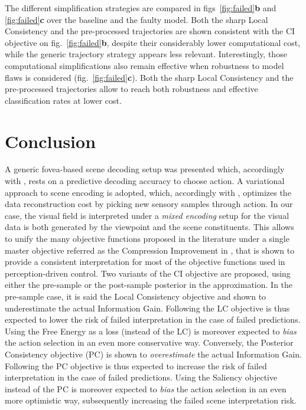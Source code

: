 \documentclass[12pt,twoside,openright]{article}
\begin{document}
The different simplification strategies are compared in figs~\ref{fig:failed}\textbf{b} and \ref{fig:failed}\textbf{c} over the baseline and the faulty model. Both the sharp Local Consistency and the pre-processed trajectories are shown consistent with the CI objective on fig.~\ref{fig:failed}\textbf{b}, despite their considerably lower computational cost, while the generic trajectory strategy appears less relevant. Interestingly, those computational simplifications also remain effective when robustness to model flaws is considered (fig.~\ref{fig:failed}\textbf{c}). 
Both the sharp Local Consistency and the pre-processed trajectories allow to reach both robustness and effective classification rates at lower cost.

\section{Conclusion}
A generic fovea-based scene decoding setup was presented which, accordingly with \citep{najemnik2005optimal}, rests on a predictive decoding accuracy to choose action. A variational approach to scene encoding is adopted, which, accordingly with \citep{friston2012perceptions}, optimizes the data reconstruction cost by picking new sensory samples through action. In our case, the visual field is interpreted under a \emph{mixed encoding} setup for the visual data is both generated by the viewpoint and the scene constituents. 
This allows to unify the many objective functions proposed in the literature under a single master objective referred as the Compression Improvement in \citep{schmidhuber2007simple}, that is shown to provide a consistent interpretation for most of the objective functions used in perception-driven control. Two variants of the CI objective are proposed, using either the pre-sample or the post-sample posterior in the approximation. In the pre-sample case, it is said the Local Consistency objective and shown to underestimate the actual Information Gain. Following the LC objective is thus expected to lower the risk of failed interpretation in the case of failed predictions. Using the Free Energy \citep{friston2015active} as a loss (instead of the LC) is moreover expected to \emph{bias} the action selection in an even more conservative way. 
Conversely, the Posterior Consistency objective (PC) is shown to \emph{overestimate} the actual Information Gain. Following the PC objective is thus expected to increase the risk of failed interpretation in the case of failed predictions. 
Using the Saliency objective \citep{itti2005bayesian} instead of the PC is moreover expected to \emph{bias} the action selection in an even more optimistic way, subsequently increasing the failed scene interpretation risk.
\end{document}
